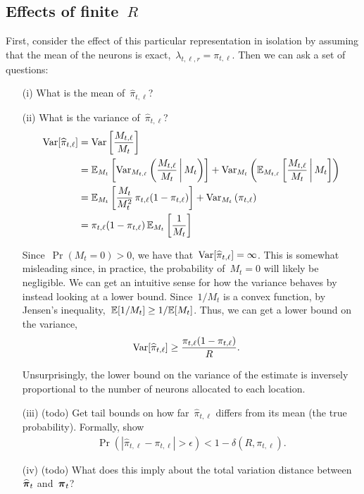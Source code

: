 \subsection{Effects of finite~$R$}
First, consider the effect of this particular representation in
isolation by assuming that the mean of the neurons is
exact,~${\lambda_{t, \ell, r} = \pi_{t,\ell}}$. Then we can ask a set
of questions:
\begin{enumerate}
\item[(i)] What is the mean of~$\widehat{\pi}_{t,\ell}$?
  
\item[(ii)] What is the variance of~$\widehat{\pi}_{t,\ell}$?
  \begin{align}
    \mathrm{Var}[\widehat{\pi}_{t,\ell}] &=
    \mathrm{Var}\left[ \frac{M_{t, \ell} }{M_t}  \right] \\
    &= \mathbb{E}_{M_t} \left[ \mathrm{Var}_{M_{t,\ell}} \left( \frac{M_{t, \ell} }{M_t} \, \bigg| \, M_t  \right) \right]
    + \mathrm{Var}_{M_t} \left( \mathbb{E}_{M_{t,\ell}} \left[ \frac{M_{t, \ell} }{M_t} \, \bigg| \, M_t \right] \right) \\
    &= \mathbb{E}_{M_t} \left[ \frac{M_{t}}{M_t^2} \, \pi_{t, \ell} (1-\pi_{t, \ell}) \right]
    + \mathrm{Var}_{M_t} \left( \pi_{t,\ell} \right) \\
        &= \pi_{t, \ell} (1-\pi_{t, \ell}) \, \mathbb{E}_{M_t} \left[ \frac{1}{M_t} \right]
  \end{align}

  Since~$\Pr(M_t=0)>0$, we have
  that~$\mathrm{Var}[\widehat{\pi}_{t,\ell}] = \infty$.  This is somewhat
  misleading since, in practice, the probability of~$M_t=0$ will
  likely be negligible. We can get an intuitive sense for how the
  variance behaves by instead looking at a lower bound.  Since~$1/M_t$
  is a convex function, by Jensen's
  inequality,~${\mathbb{E}[1/M_t] \geq 1/\mathbb{E}[M_t]}$.  Thus, we can get a
  lower bound on the variance,
  \begin{align}
    \mathrm{Var}[\widehat{\pi}_{t,\ell}] &\geq  \frac{\pi_{t, \ell} (1-\pi_{t, \ell})}{R}.
  \end{align}

  Unsurprisingly, the lower bound on the variance of the estimate is
  inversely proportional to the number of neurons allocated to each
  location. 
  \medskip

\item[(iii)] (todo) Get tail bounds on how far~$\widehat{\pi}_{t, \ell}$
  differs from its mean (the true probability). Formally, show
  \begin{align}
    \Pr(|\widehat{\pi}_{t, \ell} - \pi_{t, \ell}| > \epsilon) < 1-\delta(R,\pi_{t, \ell}).
  \end{align}



\item[(iv)] (todo) What does this imply about the total variation
  distance between~$\widehat{\boldsymbol{\pi}}_t$ and~$\boldsymbol{\pi}_t$?

\end{enumerate}

